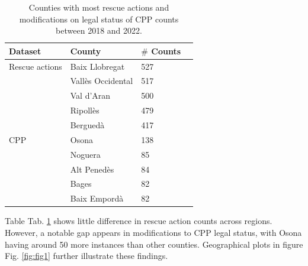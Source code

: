 \documentclass[
  journal=small,
  manuscript=mini-article,  %
  year=2023,
  volume=1,
]{odj-journal}
\begin{document}
\begin{longtable}{p{2.5cm}p{2.5cm}p{2.5cm}p{2.5cm}}
  \caption{Counties with most rescue actions and modifications on legal status of CPP counts between 2018 and 2022.}\label{tab:tab1}\\
  \toprule
  \textbf{Dataset} & \textbf{County} & \textbf{$\#$ Counts} \\
  \midrule
  \endhead
  \midrule
  \endfoot
  Rescue actions & Baix Llobregat & 527 \\
   & Vallès Occidental & 517 \\
   & Val d'Aran & 500 \\
   & Ripollès & 479 \\
   & Berguedà & 417 \\
  \midrule
  CPP & Osona & 138 \\
   & Noguera & 85 \\
   & Alt Penedès & 84 \\
   & Bages & 82 \\
   & Baix Empordà & 82 \\
  \bottomrule
\end{longtable}
Table Tab. \ref{tab:tab1} shows little difference in rescue action counts across regions. However, a notable gap appears in modifications to CPP legal status, with Osona having around 50 more instances than other counties. Geographical plots in figure Fig. \ref{fig:fig1} further illustrate these findings.
\end{document}
